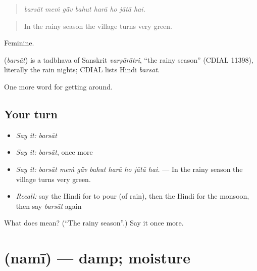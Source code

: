\begin{quote}
       
\end{quote}

\begin{quote}
\emph{barsāt meṁ gā̃v bahut harā ho jātā hai.}
\end{quote}

\begin{quote}
In the rainy season the village turns very green.
\end{quote}

Feminine.

\begin{cousinweb}
\textbf{} (\emph{barsāt}) is a tadbhava of Sanskrit \emph{varṣārātri}, \textquotedblleft{}the rainy season\textquotedblright{} (CDIAL 11398), literally the rain nights; CDIAL lists Hindi \emph{barsāt}.
\end{cousinweb}

\begin{grammarlens}[title={What you've built}]
One more word for getting around.
\end{grammarlens}

\subsection*{Your turn}
\begin{itemize}
\raggedright
  \item \emph{Say it:} \emph{barsāt}
  \item \emph{Say it:} \emph{barsāt}, once more
  \item \emph{Say it:} \emph{barsāt meṁ gā̃v bahut harā ho jātā hai.} — In the rainy season the village turns very green.
  \item \emph{Recall:} say the Hindi for to pour (of rain), then the Hindi for the monsoon, then say \emph{barsāt} again
\end{itemize}

\begin{tcolorbox}[breakable,colback=teal!4,colframe=teal!35!black,title={Before you move on}]
What does  mean? (\textquotedblleft{}The rainy season\textquotedblright{}.) Say it once more.
\end{tcolorbox}
\section[\texorpdfstring{\hi{नमी} (namī)}{नमी (namī)}]{ (namī) — damp; moisture}

